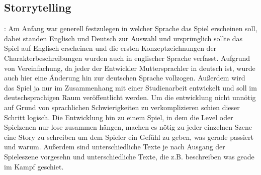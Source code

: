 \subsection{Storrytelling}: Am Anfang war generell festzulegen in welcher Sprache das Spiel erscheinen soll, dabei standen Englisch und Deutsch zur Auswahl und ursprünglich sollte das Spiel auf Englisch erscheinen und die ersten Konzeptzeichnungen der Charakterbeschreibungen wurden auch in englischer Sprache verfasst. Aufgrund von Vereinfachung, da jeder der Entwickler Muttersprachler in deutsch ist, wurde auch hier eine Änderung hin zur deutschen Sprache vollzogen. Außerdem wird das Spiel ja nur im Zusammenhang mit einer Studienarbeit entwickelt und soll im deutschsprachigen Raum veröffentlicht werden. Um die entwicklung nicht unnötig auf Grund von sprachlichen Schwierigkeiten zu verkomplizieren schien dieser Schritt logisch. Die Entwicklung hin zu einem Spiel, in dem die Level oder Spielzenen nur lose zusammen hängen, machen es nötig zu jeder einzelnen Szene eine Story zu schreiben um dem Spieler ein Gefühl zu geben, was gerade passiert und warum. Außerdem sind unterschiedliche Texte je nach Ausgang der Spieleszene vorgesehn und unterschiedliche Texte, die z.B. beschreiben was geade im Kampf geschiet.


